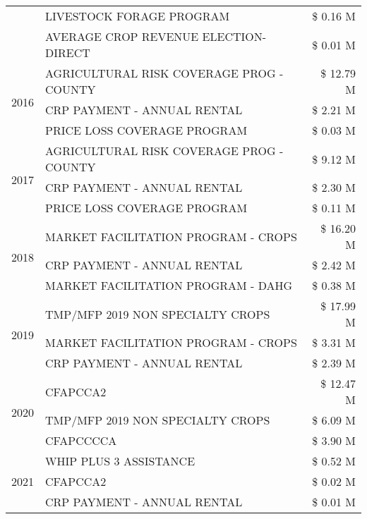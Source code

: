 \begin{tabular}{llr}
 & LIVESTOCK FORAGE PROGRAM & \$ 0.16 M \\
 & AVERAGE CROP REVENUE ELECTION-DIRECT & \$ 0.01 M \\
\cline{1-3}
\multirow[t]{3}{*}{2016} & AGRICULTURAL RISK COVERAGE PROG - COUNTY      & \$ 12.79 M \\
 & CRP PAYMENT - ANNUAL RENTAL                   & \$ 2.21 M \\
 & PRICE LOSS COVERAGE PROGRAM                   & \$ 0.03 M \\
\cline{1-3}
\multirow[t]{3}{*}{2017} & AGRICULTURAL RISK COVERAGE PROG - COUNTY & \$ 9.12 M \\
 & CRP PAYMENT - ANNUAL RENTAL & \$ 2.30 M \\
 & PRICE LOSS COVERAGE PROGRAM & \$ 0.11 M \\
\cline{1-3}
\multirow[t]{3}{*}{2018} & MARKET FACILITATION PROGRAM - CROPS & \$ 16.20 M \\
 & CRP PAYMENT - ANNUAL RENTAL & \$ 2.42 M \\
 & MARKET FACILITATION PROGRAM - DAHG & \$ 0.38 M \\
\cline{1-3}
\multirow[t]{3}{*}{2019} & TMP/MFP 2019 NON SPECIALTY CROPS & \$ 17.99 M \\
 & MARKET FACILITATION PROGRAM - CROPS & \$ 3.31 M \\
 & CRP PAYMENT - ANNUAL RENTAL & \$ 2.39 M \\
\cline{1-3}
\multirow[t]{3}{*}{2020} & CFAPCCA2 & \$ 12.47 M \\
 & TMP/MFP 2019 NON SPECIALTY CROPS & \$ 6.09 M \\
 & CFAPCCCCA & \$ 3.90 M \\
\cline{1-3}
\multirow[t]{3}{*}{2021} & WHIP PLUS 3 ASSISTANCE & \$ 0.52 M \\
 & CFAPCCA2 & \$ 0.02 M \\
 & CRP PAYMENT - ANNUAL RENTAL & \$ 0.01 M \\
\cline{1-3}
\bottomrule
\end{tabular}
